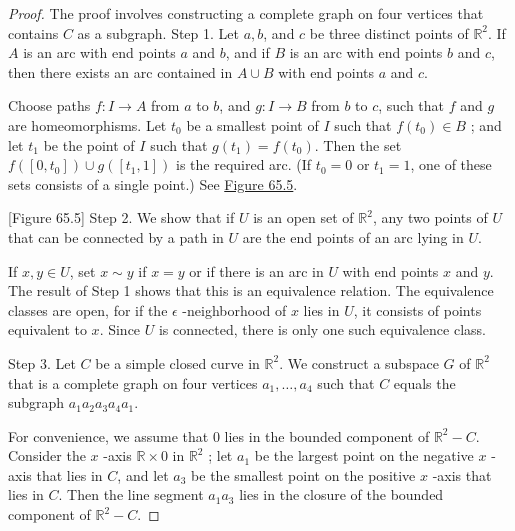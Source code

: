\begin{proof}
The proof involves constructing a complete graph on four vertices that contains \(C\) as a subgraph.
Step 1. Let \(a,b\), and \(c\) be three distinct points of \(\mathbb{R}^{2}\). If \(A\) is an arc with end points \(a\) and \(b\), and if \(B\) is an arc with end points \(b\) and \(c\), then there exists an arc contained in \(A \cup B\) with end points \(a\) and \(c\).

Choose paths \(f : I \rightarrow A\) from \(a\) to \(b\), and \(g : I \rightarrow B\) from \(b\) to \(c\), such that \(f\) and \(g\) are homeomorphisms. Let \(t_{0}\) be a smallest point of \(I\) such that \(f( t_{0}) \in B\) ; and let \(t_{1}\) be the point of \(I\) such that \(g( t_{1}) = f( t_{0})\). Then the set \(f( [ {0,t_{0}}] ) \cup g( [ {t_{1},1}] )\) is the required arc. (If \(t_{0} = 0\) or \(t_{1} = 1\), one of these sets consists of a single point.) See \hyperref[fig:65.5]{Figure 65.5}.

[Figure 65.5]
Step 2. We show that if \(U\) is an open set of \(\mathbb{R}^{2}\), any two points of \(U\) that can be connected by a path in \(U\) are the end points of an arc lying in \(U\).

If \(x,y \in U\), set \(x \sim y\) if \(x = y\) or if there is an arc in \(U\) with end points \(x\) and \(y\). The result of Step 1 shows that this is an equivalence relation. The equivalence classes are open, for if the \(\epsilon\) -neighborhood of \(x\) lies in \(U\), it consists of points equivalent to \(x\). Since \(U\) is connected, there is only one such equivalence class.

Step 3. Let \(C\) be a simple closed curve in \(\mathbb{R}^{2}\). We construct a subspace \(G\) of \(\mathbb{R}^{2}\) that is a complete graph on four vertices \(a_{1},\ldots ,a_{4}\) such that \(C\) equals the subgraph \(a_{1}a_{2}a_{3}a_{4}a_{1}\).

For convenience, we assume that 0 lies in the bounded component of \(\mathbb{R}^{2} - C\). Consider the \(x\) -axis \(\mathbb{R} \times 0\) in \(\mathbb{R}^{2}\) ; let \(a_{1}\) be the largest point on the negative \(x\) -axis that lies in \(C\), and let \(a_{3}\) be the smallest point on the positive \(x\) -axis that lies in \(C\). Then the line segment \(a_{1}a_{3}\) lies in the closure of the bounded component of \(\mathbb{R}^{2} - C\).


\end{proof}
